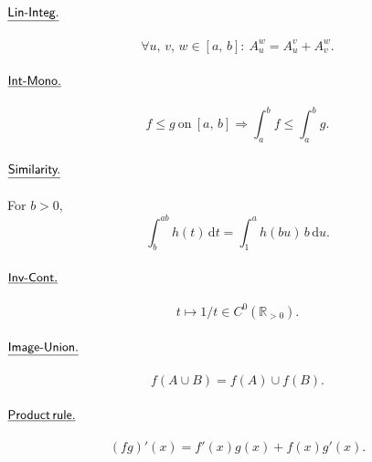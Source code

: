 \documentclass[11pt,reqno]{amsart}
\providecommand{\R}{\mathbb{R}}
\newcommand{\comma}{,\,\allowbreak}
\theoremstyle{redplain}
\begin{document}
\paragraph{$\textsf{\underline{Lin-Integ.}}$}\text{\ }
\begin{equation}\label{eq:lin-int}
\forall u\comma v\comma w\in[a\comma b]:\ A_u^w=A_u^v+A_v^w.
\end{equation}

\paragraph{$\textsf{\underline{Int-Mono.}}$}\text{\ }
\begin{equation}\label{eq:int-mono}
f\le g\ \text{on}\ [a\comma b]\Rightarrow\int_a^b f\le\int_a^b g.
\end{equation}

\paragraph{$\textsf{\underline{Similarity.}}$}\text{\ } For $b>0$\comma
\begin{equation}\label{eq:similarity}
\int_b^{ab} h(t)\,\mathrm{d}t=\int_1^a h(bu)\,b\,\mathrm{d}u.
\end{equation}

\paragraph{$\textsf{\underline{Inv-Cont.}}$}\text{\ }
\begin{equation}\label{eq:inv-cont}
t\mapsto1/t\in C^0(\R_{>0}).
\end{equation}

\paragraph{$\textsf{\underline{Image-Union.}}$}\text{\ }
\begin{equation}\label{eq:image-union}
f(A\cup B)=f(A)\cup f(B).
\end{equation}

\paragraph{$\textsf{\underline{Product\,rule.}}$}\text{\ }
\begin{equation}\label{eq:product-rule}
(fg)'(x)=f'(x)g(x)+f(x)g'(x).
\end{equation}
\end{document}
